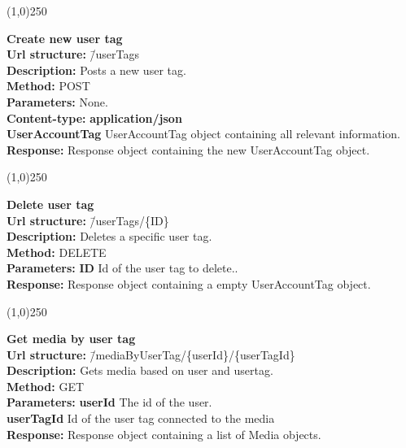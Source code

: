 \documentclass[11pt]{article}
\begin{document}
\begin{center}\line(1,0){250}\end{center}

\begin{tabbing}
\textbf{Create new user tag} \\
\textcolor{black!60}{\textbf{Url structure:}} \hspace{0.2in} \= /userTags \\
\textcolor{black!60}{\textbf{Description:}}  \> Posts a new user tag. \\
\textcolor{black!60}{\textbf{Method:}} \> POST \\
\textcolor{black!60}{\textbf{Parameters:}} \> None. \\
\textcolor{black!60}{\textbf{Content-type:}} \> \textbf{application/json} \\
\> \textbf{UserAccountTag} UserAccountTag object containing all relevant information. \\
\textcolor{black!60}{\textbf{Response:}} \> Response object containing the new UserAccountTag object.
\end{tabbing}

\begin{center}\line(1,0){250}\end{center}

\begin{tabbing}
\textbf{Delete user tag} \\
\textcolor{black!60}{\textbf{Url structure:}} \hspace{0.2in} \= /userTags/\{ID\} \\
\textcolor{black!60}{\textbf{Description:}}  \> Deletes a specific user tag. \\
\textcolor{black!60}{\textbf{Method:}} \> DELETE \\
\textcolor{black!60}{\textbf{Parameters:}} \> \textbf{ID} Id of the user tag to delete.. \\
\textcolor{black!60}{\textbf{Response:}} \> Response object containing a empty UserAccountTag object.
\end{tabbing}

\begin{center}\line(1,0){250}\end{center}

\begin{tabbing}
\textbf{Get media by user tag} \\
\textcolor{black!60}{\textbf{Url structure:}} \hspace{0.2in} \= /mediaByUserTag/\{userId\}/\{userTagId\} \\
\textcolor{black!60}{\textbf{Description:}}  \> Gets media based on user and usertag. \\
\textcolor{black!60}{\textbf{Method:}} \> GET \\
\textcolor{black!60}{\textbf{Parameters:}} \> \textbf{userId} The id of the user. \\
\> \textbf{userTagId} Id of the user tag connected to the media \\
\textcolor{black!60}{\textbf{Response:}} \> Response object containing a list of Media objects.
\end{tabbing}
\end{document}
